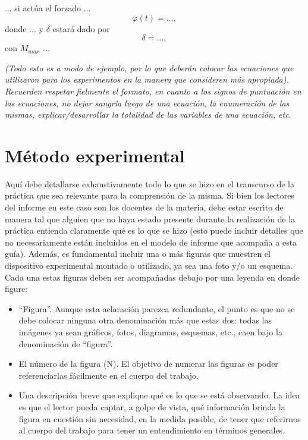 \documentclass[12pt,a4paper]{article}
\begin{document}
... si actúa el forzado ...
\begin{equation}
    \varphi(t) = ... ,
\end{equation}
donde ... y $\delta$ estará dado por
\begin{equation}
    \delta = ... ,
\end{equation}
con $M_{max}$ ...

\textit{(Todo esto es a modo de ejemplo, por lo que deberán colocar las ecuaciones que utilizaron para los experimentos en la manera que consideren más apropiada). Recuerden respetar fielmente el formato, en cuanto a los signos de puntuación en las ecuaciones, no dejar sangría luego de una ecuación, la enumeración de las mismas, explicar/desarrollar la totalidad de las variables de una ecuación, etc.}


\section{Método experimental}

Aquí debe detallarse exhaustivamente todo lo que se hizo en el transcurso de la práctica que sea relevante para la comprensión de la misma. Si bien los lectores del informe en este caso son los docentes de la materia, debe estar escrito de manera tal que alguien que no haya estado presente durante la realización de la práctica entienda claramente qué es lo que se hizo (esto puede incluir detalles que no necesariamente están incluidos en el modelo de informe que acompaña a esta guía). Además, es fundamental incluir una o más figuras que muestren el dispositivo experimental montado o utilizado, ya sea una foto y/o un esquema. Cada una estas figuras deben ser acompañadas debajo por una leyenda en donde figure:
\begin{itemize}
    \item “Figura”. Aunque esta aclaración parezca redundante, el punto es que no se debe colocar ninguna otra denominación más que estas dos: todas las imágenes ya sean gráficos, fotos, diagramas, esquemas, etc., caen bajo la denominación de “figura”.
    \item El número de la figura (N). El objetivo de numerar las figuras es poder referenciarlas fácilmente en el cuerpo del trabajo.
    \item Una descripción breve que explique qué es lo que se está observando. La idea es que el lector pueda captar, a golpe de vista, qué información brinda la figura en cuestión sin necesidad, en la medida posible, de tener que referirnos al cuerpo del trabajo para tener un entendimiento en términos generales.
\end{itemize}
\end{document}
